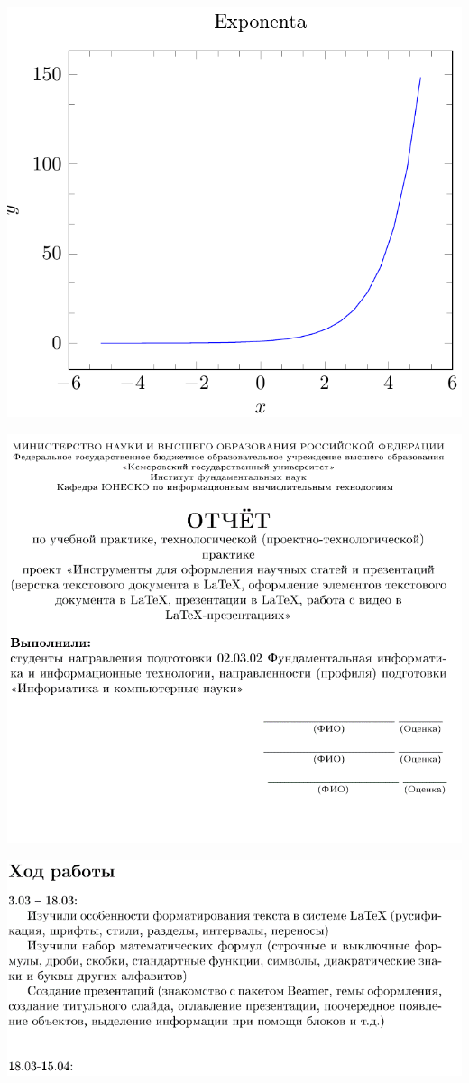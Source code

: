 \documentclass{article}
\begin{document}
	\includegraphics[width=\linewidth]{13}
	
	\includegraphics[width=\linewidth]{14}
	
	\includegraphics[width=\linewidth]{15}
	
\end{document}
